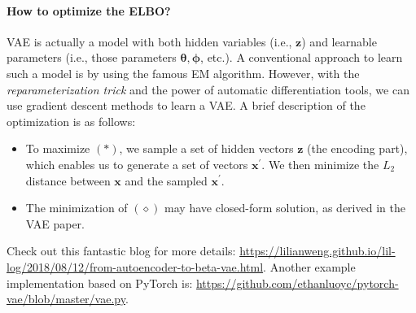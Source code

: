 \paragraph{How to optimize the ELBO?} VAE is actually a model with both hidden variables (i.e., $\bm{z}$) and learnable parameters (i.e., those parameters $\bm{\theta}, \bm{\phi}$, etc.). 
A conventional approach to learn such a model is by using the famous EM algorithm. 
However, with the \emph{reparameterization trick} and the power of automatic differentiation tools, we can use gradient descent methods to learn a VAE.
A brief description of the optimization is as follows:
    \begin{itemize}
        \item To maximize $(\ast)$, we sample a set of hidden vectors $\bm{z}$ (the encoding part), which enables us to generate a set of vectors $\bm{x}^\prime$. We then minimize the $L_2$ distance between $\bm{x}$ and the sampled $\bm{x}^\prime$.
        \item The minimization of $(\diamond)$ may have closed-form solution, as derived in the VAE paper.
    \end{itemize}
Check out this fantastic blog for more details: \url{https://lilianweng.github.io/lil-log/2018/08/12/from-autoencoder-to-beta-vae.html}.
Another example implementation based on PyTorch is: \url{https://github.com/ethanluoyc/pytorch-vae/blob/master/vae.py}.


